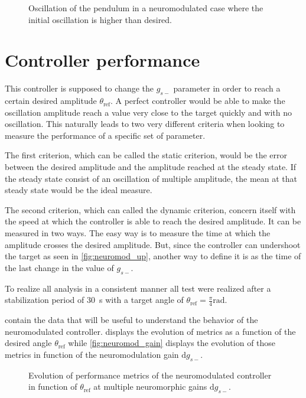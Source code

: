 \begin{figure}[!htbp]
    \centering
    \caption{Oscillation of the pendulum in a neuromodulated case where the initial oscillation is higher than desired.}
    \label{fig:neuromod_down}
\end{figure}

\section{Controller performance}

This controller is supposed to change the $g_{s-}$ parameter in order to reach a certain desired amplitude $\theta_\text{ref}$. 
A perfect controller would be able to make the oscillation amplitude reach a value very close to the target quickly and with no oscillation.
This naturally leads to two very different criteria when looking to measure the performance of a specific set of parameter.

The first criterion, which can be called the static criterion, would be the error between the desired amplitude and the amplitude reached at the steady state. 
If the steady state consist of an oscillation of multiple amplitude, the mean at that steady state would be the ideal measure.

The second criterion, which can called the dynamic criterion, concern itself with the speed at which the controller is able to reach the desired amplitude. 
It can be measured in two ways. 
The easy way is to measure the time at which the amplitude crosses the desired amplitude. 
But, since the controller can undershoot the target as seen in \cref{fig:neuromod_up}, another way to define it is as the time of the last change in the value of $g_{s-}$.

To realize all analysis in a consistent manner all test were realized after a stabilization period of \qty{30}{\second} with a target angle of $\theta_\text{ref} = \frac{\pi}{4}\unit{\radian}$.

 contain the data that will be useful to understand the behavior of the neuromodulated controller.
 displays the evolution of metrics as a function of the desired angle $\theta_\text{ref}$ while \cref{fig:neuromod_gain} displays the evolution of those metrics in function of the neuromodulation gain $\mathrm{d}g_{s-}$.

\begin{figure}[!htbp]
    \centering
    \caption{Evolution of performance metrics of the neuromodulated controller in function of $\theta_\text{ref}$ at multiple neuromorphic gains $\mathrm{d}g_{s-}$.}
    \label{fig:neuromod_tgt}
\end{figure}

